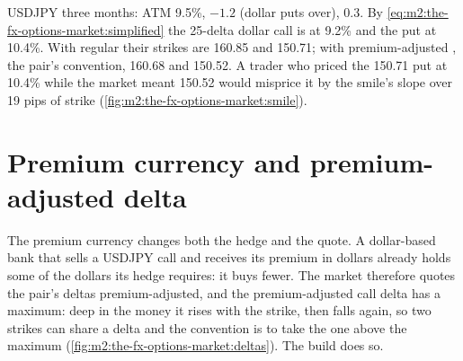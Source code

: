\begin{example}\label{ex:m2:the-fx-options-market:jpy}
USDJPY three months: ATM 9.5\%,  $-1.2$ (dollar puts over), 
0.3. By \cref{eq:m2:the-fx-options-market:simplified} the 25-delta dollar call is
at 9.2\% and the put at 10.4\%. With regular  their strikes are 160.85
and 150.71; with premium-adjusted , the pair's convention, 160.68 and
150.52. A trader who priced the 150.71 put at 10.4\% while the market meant 150.52
would misprice it by the smile's slope over 19 pips of strike
(\cref{fig:m2:the-fx-options-market:smile}).
\end{example}

\section{Premium currency and premium-adjusted delta}

The premium currency changes both the hedge and the quote. A dollar-based bank
that sells a USDJPY call and receives its premium in dollars already holds some of
the dollars its hedge requires: it buys fewer. The market therefore quotes the
pair's deltas premium-adjusted, and the premium-adjusted call delta has a maximum:
deep in the money it rises with the strike, then falls again, so two strikes
can share a delta and the convention is to take the one above the maximum
(\cref{fig:m2:the-fx-options-market:deltas}). The build does so.

